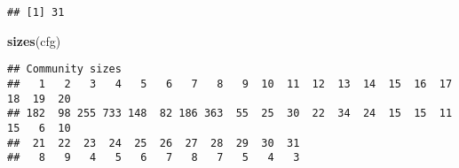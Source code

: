 \documentclass[
]{article}
\newenvironment{Shaded}{\begin{snugshade}}{\end{snugshade}}
\newcommand{\CommentTok}[1]{\textcolor[rgb]{0.56,0.35,0.01}{\textit{#1}}}
\newcommand{\KeywordTok}[1]{\textcolor[rgb]{0.13,0.29,0.53}{\textbf{#1}}}
\newcommand{\NormalTok}[1]{#1}
\newcommand{\OperatorTok}[1]{\textcolor[rgb]{0.81,0.36,0.00}{\textbf{#1}}}
\begin{document}
\begin{Shaded}
\end{Shaded}

\begin{verbatim}
## [1] 31
\end{verbatim}

\begin{Shaded}
\begin{Highlighting}[]
\KeywordTok{sizes}\NormalTok{(cfg)}
\end{Highlighting}
\end{Shaded}

\begin{verbatim}
## Community sizes
##   1   2   3   4   5   6   7   8   9  10  11  12  13  14  15  16  17  18  19  20 
## 182  98 255 733 148  82 186 363  55  25  30  22  34  24  15  15  11  15   6  10 
##  21  22  23  24  25  26  27  28  29  30  31 
##   8   9   4   5   6   7   8   7   5   4   3
\end{verbatim}

\begin{Shaded}
\end{Shaded}
\end{document}
